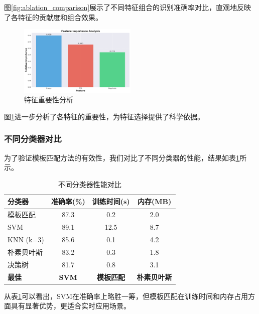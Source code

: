 \documentclass[sigconf,nonacm]{acmart}
\begin{document}
图\ref{fig:ablation_comparison}展示了不同特征组合的识别准确率对比，直观地反映了各特征的贡献度和组合效果。

\begin{figure}[htbp]
\centering
\includegraphics[width=0.5\textwidth]{ablation/feature_importance.png}
\caption{特征重要性分析}
\label{fig:feature_importance}
\end{figure}

图\ref{fig:feature_importance}进一步分析了各特征的重要性，为特征选择提供了科学依据。

\subsubsection{不同分类器对比}

为了验证模板匹配方法的有效性，我们对比了不同分类器的性能，结果如表\ref{tab:classifier_comparison}所示。

\begin{table}[htbp]
\caption{不同分类器性能对比}
\label{tab:classifier_comparison}
\begin{center}
\begin{tabular}{lccc}
\toprule
\textbf{分类器} & \textbf{准确率(\%)} & \textbf{训练时间(s)} & \textbf{内存(MB)} \\
\midrule
模板匹配 & 87.3 & 0.2 & 2.0 \\
SVM & 89.1 & 12.5 & 8.7 \\
KNN (k=3) & 85.6 & 0.1 & 4.2 \\
朴素贝叶斯 & 83.2 & 0.3 & 1.8 \\
决策树 & 81.7 & 0.8 & 3.1 \\
\midrule
\textbf{最佳} & \textbf{SVM} & \textbf{模板匹配} & \textbf{朴素贝叶斯} \\
\bottomrule
\end{tabular}
\end{center}
\end{table}

从表\ref{tab:classifier_comparison}可以看出，SVM在准确率上略胜一筹，但模板匹配在训练时间和内存占用方面具有显著优势，更适合实时应用场景。
\end{document}
